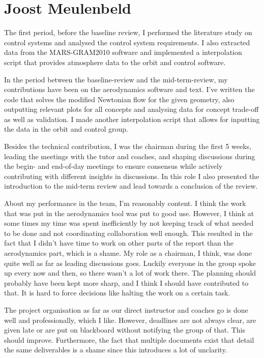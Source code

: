 \section{Joost Meulenbeld}

The first period, before the baseline review, I performed the literature study on control systems and analysed the control system requirements. I also extracted data from the MARS-GRAM2010 software and implemented a interpolation script that provides atmosphere data to the orbit and control software.

In the period between the baseline-review and the mid-term-review, my contributions have been on the aerodynamics software and text. I've written the code that solves the modified Newtonian flow for the given geometry, also outputting relevant plots for all concepts and analysing data for concept trade-off as well as validation. I made another interpolation script that allows for inputting the data in the orbit and control group.

Besides the technical contribution, I was the chairman during the first 5 weeks, leading the meetings with the tutor and coaches, and shaping discussions during the begin- and end-of-day meetings to ensure consensus while actively contributing with different insights in discussions. In this role I also presented the introduction to the mid-term review and lead towards a conclusion of the review.

About my performance in the team, I'm reasonably content. I think the work that was put in the aerodynamics tool was put to good use. However, I think at some times my time was spent inefficiently by not keeping track of what needed to be done and not coordinating collaboration well enough. This resulted in the fact that I didn't have time to work on other parts of the report than the aerodynamics part, which is a shame. My role as a chairman, I think, was done quite well as far as leading discussions goes. Luckily everyone in the group spoke up every now and then, so there wasn't a lot of work there. The planning should probably have been kept more sharp, and I think I should have contributed to that. It is hard to force decisions like halting the work on a certain task.

The project organisation as far as our direct instructor and coaches go is done well and professionally, which I like. However, deadlines are not always clear, are given late or are put on blackboard without notifying the group of that. This should improve. Furthermore, the fact that multiple documents exist that detail the same deliverables is a shame since this introduces a lot of unclarity.